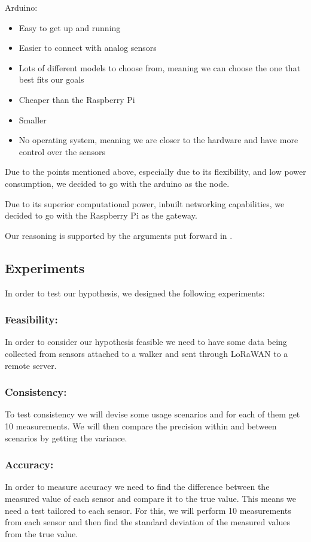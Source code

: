 Arduino:
\begin{itemize}
	\item Easy to get up and running
	\item Easier to connect with analog sensors
	\item Lots of different models to choose from, meaning we can choose the one that best fits our goals
	\item Cheaper than the Raspberry Pi
	\item Smaller 
	\item No operating system, meaning we are closer to the hardware and have more control over the sensors
\end{itemize}



Due to the points mentioned above, especially due to its flexibility, and low power consumption, we decided to go with the arduino as the node.

Due to its superior computational power, inbuilt networking capabilities, we decided to go with the Raspberry Pi as the gateway.

Our reasoning is supported by the arguments put forward in \cite{postolache2011smart}.


\subsection{Experiments}
In order to test our hypothesis, we designed the following experiments:

\subsubsection{Feasibility:}
In order to consider our hypothesis feasible we need to have some data being collected from sensors attached to a walker and sent through LoRaWAN to a remote server.

\subsubsection{Consistency:}
To test consistency we will devise some usage scenarios and for each of them get 10 measurements. We will then compare the precision within and between scenarios by getting the variance.

\subsubsection{Accuracy:}
In order to measure accuracy we need to find the difference between the measured value of each sensor and compare it to the true value. This means we need a test tailored to each sensor. For this, we will perform 10 measurements from each sensor and then find the standard deviation of the measured values from the true value.

